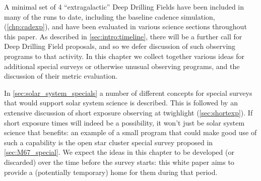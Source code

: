 A minimal set of 4 ``extragalactic'' Deep Drilling Fields have been
included in many of the \OpSim runs to date, including the baseline cadence simulation,  (\autoref{chp:cadexp}), and have
been evaluated in various science sections throughout this paper.
As described in \autoref{sec:intro:timeline}, there will be a further call for Deep Drilling Field proposals, and so we defer discussion of such observing programs to that activity. In this chapter we collect together various ideas for additional special surveys or otherwise unusual observing programs, and the discussion of their metric evaluation.

In \autoref{sec:solar_system_specials} a number of different concepts for special surveys that would support solar system science is described. This is followed by an extensive discussion of short exposure observing at twighlight (\autoref{sec:shortexp}). If short exposure times will indeed be a possibility, it won't just be solar system science that benefits: an example of a small program that could make good use of such a capability is the open star cluster special survey proposed in \autoref{sec:M67_special}. We expect the ideas in this chapter to be developed (or discarded) over the time before the survey starts: this white paper aims to provide a (potentially temporary) home for them during that period.




% 


% 











